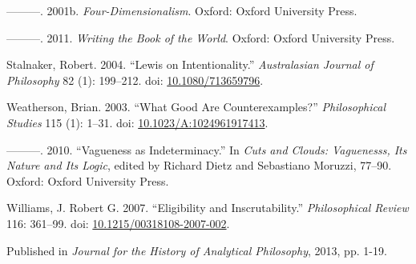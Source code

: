 \documentclass[
  10pt,
  letterpaper,
  DIV=11,
  numbers=noendperiod,
  twoside]{scrartcl}
\newlength{\cslhangindent}
\newenvironment{CSLReferences}[2] %
 {\begin{list}{}{%
  \setlength{\itemindent}{0pt}
  \setlength{\leftmargin}{0pt}
  \setlength{\parsep}{0pt}
  \ifodd #1
   \setlength{\leftmargin}{\cslhangindent}
   \setlength{\itemindent}{-1\cslhangindent}
  \fi
  \setlength{\itemsep}{#2\baselineskip}}}
 {\end{list}}
\begin{document}
\begin{CSLReferences}{1}{0}
---------. 2001b. \emph{Four-Dimensionalism}. Oxford: Oxford University
Press.

---------. 2011. \emph{Writing the Book of the World}. Oxford: Oxford
University Press.

Stalnaker, Robert. 2004. {``{Lewis on Intentionality}.''}
\emph{Australasian Journal of Philosophy} 82 (1): 199--212. doi:
\href{https://doi.org/10.1080/713659796}{10.1080/713659796}.

Weatherson, Brian. 2003. {``{What Good Are Counterexamples?}''}
\emph{Philosophical Studies} 115 (1): 1--31. doi:
\href{https://doi.org/10.1023/A:1024961917413}{10.1023/A:1024961917413}.

---------. 2010. {``Vagueness as Indeterminacy.''} In \emph{Cuts and
Clouds: Vaguenesss, Its Nature and Its Logic}, edited by Richard Dietz
and Sebastiano Moruzzi, 77--90. Oxford: Oxford University Press.

Williams, J. Robert G. 2007. {``Eligibility and Inscrutability.''}
\emph{Philosophical Review} 116: 361--99. doi:
\href{https://doi.org/10.1215/00318108-2007-002}{10.1215/00318108-2007-002}.

\end{CSLReferences}



\noindent Published in\emph{
Journal for the History of Analytical Philosophy}, 2013, pp. 1-19.
\end{document}
